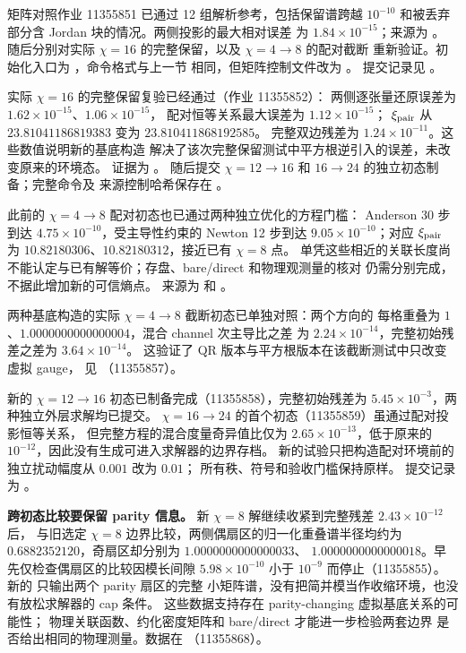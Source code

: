矩阵对照作业 11355851 已通过 12 组解析参考，包括保留谱跨越
$10^{-10}$ 和被丢弃部分含 Jordan 块的情况。两侧投影的最大相对误差
为 $1.84\times10^{-15}$；来源为 。
随后分别对实际 $\chi=16$ 的完整保留，以及 $\chi=4\to8$ 的配对截断
重新验证。初始化入口为 ，命令格式与上一节
相同，但矩阵控制文件改为 。
提交记录见 。


实际 $\chi=16$ 的完整保留复验已经通过（作业 11355852）：
两侧逐张量还原误差为 $1.62\times10^{-15}$、$1.06\times10^{-15}$，
配对恒等关系最大误差为 $1.12\times10^{-15}$；
$\xi_{\rm pair}$ 从 $23.81041186819383$ 变为 $23.810411868192585$。
完整双边残差为 $1.24\times10^{-11}$。这些数值说明新的基底构造
解决了该次完整保留测试中平方根逆引入的误差，未改变原来的环境态。
证据为 。
随后提交 $\chi=12\to16$ 和 $16\to24$ 的独立初态制备；完整命令及
来源控制哈希保存在 。

此前的 $\chi=4\to8$ 配对初态也已通过两种独立优化的方程门槛：
Anderson 30 步到达 $4.75\times10^{-10}$，受主导性约束的 Newton
12 步到达 $9.05\times10^{-10}$；对应 $\xi_{\rm pair}$ 为
$10.82180306$、$10.82180312$，接近已有 $\chi=8$ 点。
单凭这些相近的关联长度尚不能认定与已有解等价；存盘、bare/direct 和物理观测量的核对
仍需分别完成，不据此增加新的可信熵点。
来源为  和
。


两种基底构造的实际 $\chi=4\to8$ 截断初态已单独对照：两个方向的
每格重叠为 $1$、$1.0000000000000004$，混合 channel 次主导比之差
为 $2.24\times10^{-14}$，完整初始残差之差为 $3.64\times10^{-14}$。
这验证了 QR 版本与平方根版本在该截断测试中只改变虚拟 gauge，
见 （11355857）。

新的 $\chi=12\to16$ 初态已制备完成（11355858），完整初始残差为
$5.45\times10^{-3}$，两种独立外层求解均已提交。
$\chi=16\to24$ 的首个初态（11355859）虽通过配对投影恒等关系，
但完整方程的混合度量奇异值比仅为 $2.65\times10^{-13}$，低于原来的
$10^{-12}$，因此没有生成可进入求解器的边界存档。
新的试验只把构造配对环境前的独立扰动幅度从 $0.001$ 改为 $0.01$；
所有秩、符号和验收门槛保持原样。
提交记录为 。

\textbf{跨初态比较要保留 parity 信息。}
新 $\chi=8$ 解继续收紧到完整残差 $2.43\times10^{-12}$ 后，
与旧选定 $\chi=8$ 边界比较，两侧偶扇区的归一化重叠谱半径均约为
$0.6882352120$，奇扇区却分别为 $1.0000000000000033$、
$1.0000000000000018$。早先仅检查偶扇区的比较因模长间隙
$5.98\times10^{-10}$ 小于 $10^{-9}$ 而停止（11355855）。
新的  只输出两个 parity 扇区的完整
小矩阵谱，没有把简并模当作收缩环境，也没有放松求解器的 cap 条件。
这些数据支持存在 parity-changing 虚拟基底关系的可能性；
物理关联函数、约化密度矩阵和 bare/direct 才能进一步检验两套边界
是否给出相同的物理测量。数据在
（11355868）。


